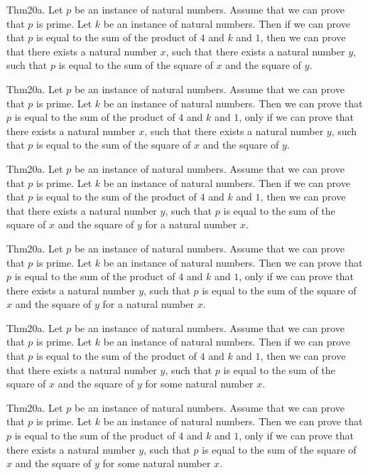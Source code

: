 \documentclass{article}
\begin{document}
Thm20a. Let $p$ be an instance of natural numbers. Assume that we can prove that $p$ is prime. Let $k$ be an instance of natural numbers. Then if we can prove that $p$ is equal to the sum of the product of $4$ and $k$ and $1$, then we can prove that there exists a natural number $x$, such that there exists a natural number $y$, such that $p$ is equal to the sum of the square of $x$ and the square of $y$.

Thm20a. Let $p$ be an instance of natural numbers. Assume that we can prove that $p$ is prime. Let $k$ be an instance of natural numbers. Then we can prove that $p$ is equal to the sum of the product of $4$ and $k$ and $1$, only if we can prove that there exists a natural number $x$, such that there exists a natural number $y$, such that $p$ is equal to the sum of the square of $x$ and the square of $y$.

Thm20a. Let $p$ be an instance of natural numbers. Assume that we can prove that $p$ is prime. Let $k$ be an instance of natural numbers. Then if we can prove that $p$ is equal to the sum of the product of $4$ and $k$ and $1$, then we can prove that there exists a natural number $y$, such that $p$ is equal to the sum of the square of $x$ and the square of $y$ for a natural number $x$.

Thm20a. Let $p$ be an instance of natural numbers. Assume that we can prove that $p$ is prime. Let $k$ be an instance of natural numbers. Then we can prove that $p$ is equal to the sum of the product of $4$ and $k$ and $1$, only if we can prove that there exists a natural number $y$, such that $p$ is equal to the sum of the square of $x$ and the square of $y$ for a natural number $x$.

Thm20a. Let $p$ be an instance of natural numbers. Assume that we can prove that $p$ is prime. Let $k$ be an instance of natural numbers. Then if we can prove that $p$ is equal to the sum of the product of $4$ and $k$ and $1$, then we can prove that there exists a natural number $y$, such that $p$ is equal to the sum of the square of $x$ and the square of $y$ for some natural number $x$.

Thm20a. Let $p$ be an instance of natural numbers. Assume that we can prove that $p$ is prime. Let $k$ be an instance of natural numbers. Then we can prove that $p$ is equal to the sum of the product of $4$ and $k$ and $1$, only if we can prove that there exists a natural number $y$, such that $p$ is equal to the sum of the square of $x$ and the square of $y$ for some natural number $x$.
\end{document}
